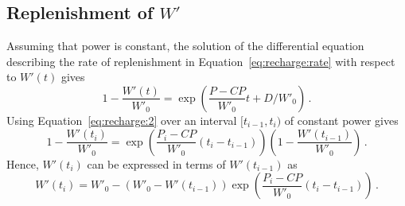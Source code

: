 \message{ !name(trackeR.Rnw)}\documentclass[nojss]{jss}
\begin{document}
\begin{appendix}

\section[Replenishment of W']{Replenishment of $W'$}
\label{sec:appendix}

Assuming that power is constant, the solution of the differential equation
describing the rate of replenishment in Equation~\ref{eq:recharge:rate} with respect
to $W'(t)$ gives
%
\begin{equation}
  \label{eq:recharge:2}
  1 - \frac{W'(t)}{W'_0} = \exp \left( \frac{P- CP}{W'_0}  t + D / W'_0 \right)
  \, .
\end{equation}
%
Using Equation~\ref{eq:recharge:2} over an interval $[t_{i-1}, t_i)$ of constant
power gives
%
\begin{equation*}
  1 - \frac{W'(t_i)}{W'_0} = \exp \left( \frac{P_i - CP}{W'_0}  (t_i -
    t_{i-1}) \right) \left( 1 - \frac{W'(t_{i-1})}{W'_0} \right) \, .
\end{equation*}
%
Hence, $W'(t_i)$ can be expressed in terms of $W'(t_{i-1})$ as
%
\begin{equation*}
   W'(t_i) = W'_0 - \left( W'_0 - W'(t_{i-1}) \right) \exp \left( \frac{P_i -
      CP}{W'_0}  (t_i - t_{i-1}) \right) \, .
\end{equation*}
%



\end{appendix}
\end{document}
